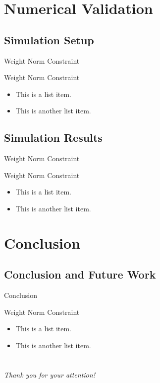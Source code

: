 \documentclass[aspectratio=169]{beamer}
\begin{document}
\section{Numerical Validation}

\subsection{Simulation Setup}
\begin{frame}{Weight Norm Constraint}
    \begin{block}{Weight Norm Constraint}
        \begin{itemize}
            \item This is a list item.
            \item This is another list item.
        \end{itemize}
    \end{block}
\end{frame}

\subsection{Simulation Results}
\begin{frame}{Weight Norm Constraint}
    \begin{block}{Weight Norm Constraint}
        \begin{itemize}
            \item This is a list item.
            \item This is another list item.
        \end{itemize}
    \end{block}
\end{frame}

\section{Conclusion}

\subsection{Conclusion and Future Work}
\begin{frame}{Conclusion}
    \begin{block}{Weight Norm Constraint}
        \begin{itemize}
            \item This is a list item.
            \item This is another list item.
        \end{itemize}
    \end{block}
\end{frame}

\section{}
\begin{frame}{}
    \centering \Large
    \emph{Thank you for your attention!}
\end{frame}
\end{document}
